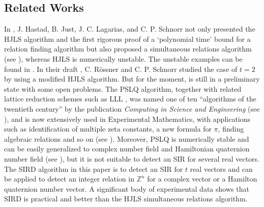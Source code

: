 \documentclass{sig-alternate}
\numberwithin{theorem}{section} \numberwithin{equation}{section}
\begin{document}
\subsection{Related Works}
In \cite{HHL1986, HJL1989}, J. Hastad, B. Just, J. C. Lagarias, and
C. P. Schnorr not only presented the HJLS algorithm and the first
rigorous proof of a `polynomial time' bound for a relation finding
algorithm but also proposed a simultaneous relations algorithm (see
 \cite[section 5]{HJL1989}), whereas HJLS
 is numerically unstable. The unstable examples can be
found in \cite{FB1992, FBA1999}. In their draft \cite{RS1997}, C. R{\"o}ssner and C. P.
Schnorr studied the case of $t = 2$ by using a modified HJLS
algorithm. But for the moment, \cite{RS1997} is still in a
preliminary state with some open problems. The PSLQ algorithm,
together with related lattice reduction schemes such as LLL
\cite{LLL1982}, was named one of ten ``algorithms of the twentieth
century'' by the publication \emph{Computing in Science and
Engineering} (see \cite{DS2000, BBC2007}), and is now extensively
used in Experimental Mathematics, with applications such as
identification of multiple zeta constants,
a new formula for $\pi$, finding algebraic relations and so on (see \cite{BB2001, BBC2007, BB2009}). Moreover,
PSLQ is numerically stable and can be easily generalized to complex
number field and Hamiltonian quaternion number field (see
\cite{FBA1999}), but
 it is not suitable to
detect an SIR for several real vectors.\\

The SIRD algorithm in this paper is to detect an SIR for $t$ real
vectors and can be applied to detect an integer relation in
$\mathbb{Z}^n$ for a
 complex vector or a Hamilton quaternion number vector. A significant
body of experimental data shows that SIRD is practical and better
than the HJLS simultaneous relations algorithm.
\end{document}
